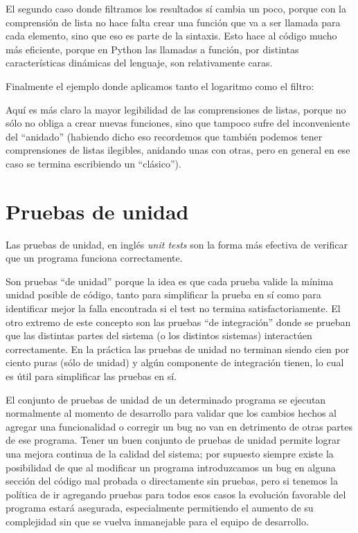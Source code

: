 
El segundo caso donde filtramos los resultados sí cambia un poco, porque con la comprensión de lista no hace falta crear una función que va a ser llamada para cada elemento, sino que eso es parte de la sintaxis. Esto hace al código mucho más eficiente, porque en Python las llamadas a función, por distintas características dinámicas del lenguaje, son relativamente caras.


Finalmente el ejemplo donde aplicamos tanto el logaritmo como el filtro:


Aquí es más claro la mayor legibilidad de las comprensiones de listas, porque no sólo no obliga a crear nuevas funciones, sino que tampoco sufre del inconveniente del ``anidado'' (habiendo dicho eso recordemos que también podemos tener comprensiones de listas ilegibles, anidando unas con otras, pero en general en ese caso se termina escribiendo un  ``clásico'').


\section{Pruebas de unidad} \label{sec:pruebasunidad}

Las pruebas de unidad, en inglés \textit{unit tests} son la forma más efectiva de verificar que un programa funciona correctamente. 

Son pruebas ``de unidad'' porque la idea es que cada prueba valide la mínima unidad posible de código, tanto para simplificar la prueba en sí como para identificar mejor la falla encontrada si el test no termina satisfactoriamente. El otro extremo de este concepto son las pruebas ``de integración'' donde se prueban que las distintas partes del sistema (o los distintos sistemas) interactúen correctamente. En la práctica las pruebas de unidad no terminan siendo cien por ciento puras (sólo de unidad) y algún componente de integración tienen, lo cual es útil para simplificar las pruebas en sí.

El conjunto de pruebas de unidad de un determinado programa se ejecutan normalmente al momento de desarrollo para validar que los cambios hechos al agregar una funcionalidad o corregir un bug no van en detrimento de otras partes de ese programa. Tener un buen conjunto de pruebas de unidad permite lograr una mejora continua de la calidad del sistema; por supuesto siempre existe la posibilidad de que al modificar un programa introduzcamos un bug en alguna sección del código mal probada o directamente sin pruebas, pero si tenemos la política de ir agregando pruebas para todos esos casos la evolución favorable del programa estará asegurada, especialmente permitiendo el aumento de su complejidad sin que se vuelva inmanejable para el equipo de desarrollo.

